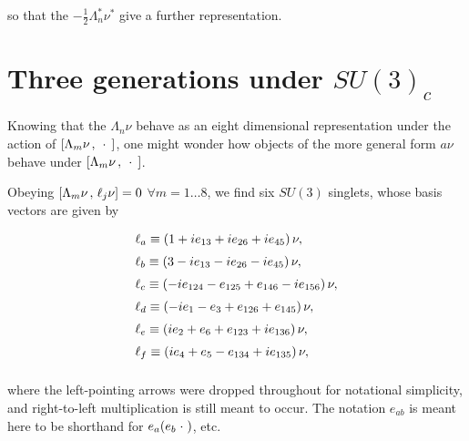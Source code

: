 \documentclass[letterpaper,12pt,titlepage,oneside,final]{book}
\newcommand{\spacer}{0.2cm}
\begin{document}
\noindent so that the $-\frac{1}{2}\Lambda_n^*\nu^*$ give a further representation.




\section{Three generations under $SU(3)_c$ }


Knowing that the $\Lambda_n\nu$ behave as an eight dimensional representation under the action of $\left[\Lambda_m\nu \hspace{0.5mm} , \hspace{1.5mm}\cdot\hspace{1.5mm}\right]$, one might wonder how objects of the more general form $a\nu$ behave under $\left[\Lambda_m\nu \hspace{0.5mm} ,\hspace{1.5mm}\cdot\hspace{1.5mm}\right]$.


Obeying $\left[\Lambda_m\nu\hspace{0.5mm} ,\hspace{0.5mm} \ell_j\nu\right]=0$ $\forall m=1\dots8$, we find six $SU(3)$ singlets, whose basis vectors are given by

\begin{equation}\begin{array}{l}\label{lept}
\ell_{a}\equiv \left(1+ie_{13}+ie_{26}+ie_{45}\right)\nu, \vspace{\spacer}\\
\ell_{b}\equiv\left(3-ie_{13}-ie_{26}-ie_{45}\right)\nu, \vspace{\spacer}\\
\ell_{c}\equiv \left(-ie_{124}-e_{125}+e_{146}-ie_{156}\right)\nu, \vspace{\spacer} \\
\ell_{d}\equiv \left(-ie_{1}-e_{3}+e_{126}+e_{145}\right)\nu, \vspace{\spacer} \\
\ell_{e}\equiv \left(ie_{2}+e_{6}+e_{123}+ie_{136}\right)\nu, \vspace{\spacer} \\
\ell_{f}\equiv \left(ie_{4}+e_{5}-e_{134}+ie_{135}\right)\nu, \vspace{\spacer} \\
\end{array}\end{equation}

\noindent where the left-pointing arrows were dropped throughout for notational simplicity, and right-to-left multiplication is still meant to occur.  The notation $e_{ab}$ is meant here to be shorthand for $e_a(e_b \hspace{1mm}\cdot\hspace{1mm})$, etc.  
\end{document}
